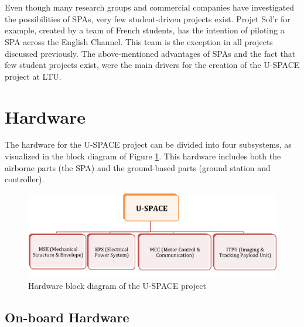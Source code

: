 \\
\\
Even though many research groups and commercial companies have investigated the possibilities of \ac{SPA}s, very few student-driven projects exist. Projet Sol'r \cite{website:solr} for example, created by a team of French students, has the intention of piloting a \ac{SPA} across the English Channel. This team is the exception in all projects discussed previously. The above-mentioned advantages of \ac{SPA}s and the fact that few student projects exist, were the main drivers for the creation of the \ac{U-SPACE} project at \ac{LTU}.

\section{Hardware}
\label{sec:intro_hardware}

The hardware for the \ac{U-SPACE} project can be divided into four subsystems, as visualized in the block diagram of Figure \ref{fig:hardware_block}. This hardware includes both the airborne parts (the \ac{SPA}) and the ground-based parts (ground station and controller).

\begin{figure}[htbp!]
\centering
\includegraphics[width=\textwidth]{figures/hardware_block.png}
\caption{Hardware block diagram of the U-SPACE project}
\label{fig:hardware_block}
\end{figure}

\subsection{On-board Hardware}

